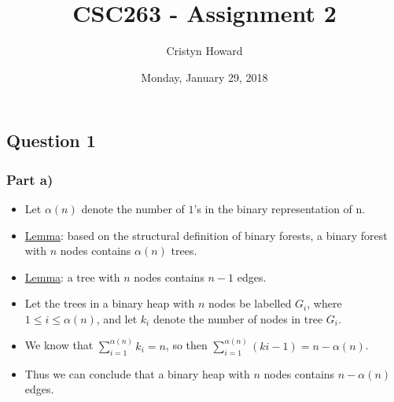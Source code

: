 \documentclass[11pt]{article}
\title{CSC263 - Assignment 2}
\author{Cristyn Howard}
\date{Monday, January 29, 2018}
\begin{document}
\maketitle

\subsection*{Question 1}
\subsubsection*{Part a)}
\begin{itemize}
\item Let $\alpha(n)$ denote the number of $1$'s in the binary representation of n.
\item \underline{Lemma}: based on the structural definition of binary forests, a binary forest with $n$ nodes contains $\alpha(n)$ trees.
\item \underline{Lemma}: a tree with $n$ nodes contains $n-1$ edges.
\item Let the trees in a binary heap with $n$ nodes be labelled $G_i$, where $1 \leq i \leq \alpha(n)$, and let  $k_i$ denote the number of nodes in tree $G_i$.
\item We know that $\sum_{i=1}^{\alpha(n)}k_i = n$, so then $\sum_{i=1}^{\alpha(n)} (ki-1) = n - \alpha(n)$.
\item Thus we can conclude that a binary heap with $n$ nodes contains $ n - \alpha(n)$ edges.
\end{itemize}
\end{document}
